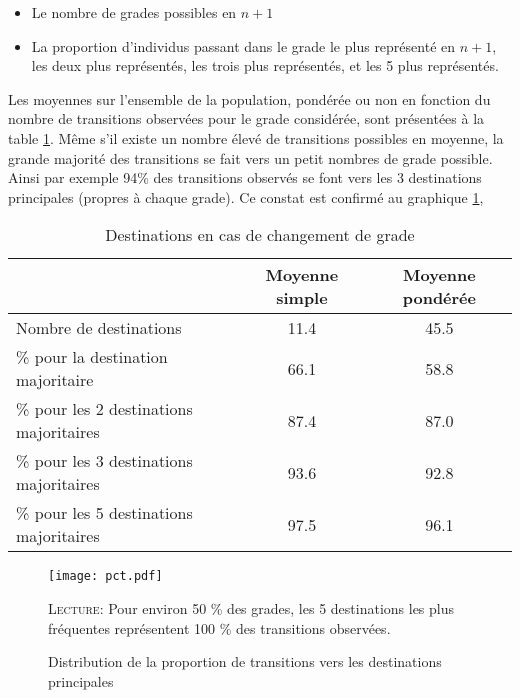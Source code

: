 \documentclass[11pt,a4paper]{article}
\begin{document}
\begin{itemize}[leftmargin=1cm ,parsep=0cm,itemsep=0cm,topsep=0cm] 
\item Le nombre de grades possibles en $n+1$
\item La proportion d'individus passant dans le grade le plus représenté en $n+1$, les deux plus représentés, les trois plus représentés, et les 5 plus représentés. 
\end{itemize}

Les moyennes sur l'ensemble de la population, pondérée ou non en fonction du nombre de transitions observées pour le grade considérée, sont présentées à la table \ref{means}. Même s'il existe un nombre élevé de transitions possibles en moyenne, la grande majorité des transitions se fait vers un petit nombres de grade possible. Ainsi par exemple 94\% des transitions observés se font vers les 3 destinations principales (propres à chaque grade). Ce constat est confirmé au graphique \ref{pct},

\begin{table}[ht]
\label{means}
\centering
\caption{Destinations en cas de changement de grade} 
\begin{tabular}{l|cc}
  \hline
 & Moyenne simple & Moyenne pondérée \\ 
  \hline
Nombre de destinations & 11.4 & 45.5 \\ 
  \% pour la destination majoritaire & 66.1 & 58.8 \\ 
  \% pour les 2 destinations majoritaires & 87.4 & 87.0 \\ 
  \% pour les 3 destinations majoritaires & 93.6 & 92.8 \\ 
  \% pour les 5 destinations majoritaires & 97.5 & 96.1 \\ 
   \hline
\end{tabular}
\end{table}



\begin{figure}[t]
  \label{pct}
\caption{Distribution de la proportion de transitions vers les destinations principales}
\vspace{-0.1cm}
\centering
 \texttt{[image: pct.pdf]}
\vspace{0.1cm}  
\begin{minipage}{12cm}%
\small \textsc{Lecture:} Pour environ 50 \% des grades, les 5 destinations les plus fréquentes représentent 100 \% des transitions observées.  
 \end{minipage}%
\end{figure}
\end{document}
